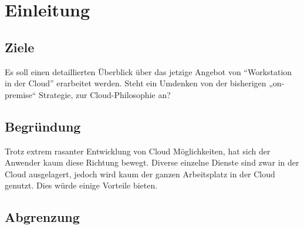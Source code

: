 
\chapter{Einleitung}

\section{Ziele}
Es soll einen detaillierten Überblick über das jetzige Angebot von “Workstation in der Cloud” erarbeitet werden. 
Steht ein Umdenken von der bisherigen „on-premise“ Strategie, zur Cloud-Philosophie an?

\section{Begründung}
Trotz extrem rasanter Entwicklung von Cloud Möglichkeiten, hat sich der Anwender kaum diese Richtung bewegt.
Diverse einzelne Dienste sind zwar in der Cloud ausgelagert, jedoch wird kaum der ganzen Arbeitsplatz in der Cloud genutzt. Dies würde einige Vorteile bieten.

\section{Abgrenzung}


